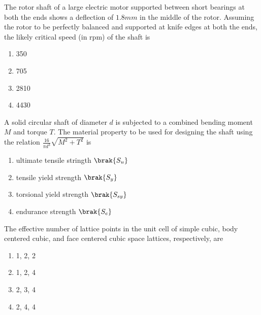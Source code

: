 \iffalse
\chapter{2009}
\author{AI24BTECH11031}
\section{me}
\fi

\item The rotor shaft of a large electric motor supported between short bearings at both the ends
shows a deflection of $1.8 mm$ in the middle of the rotor. Assuming the rotor to be perfectly balanced
and supported at knife edges at both the ends, the likely critical speed (in rpm) of the shaft is

\begin{multicols}{4}
\begin{enumerate}
    \item 350
    \item 705
    \item 2810
    \item 4430
\end{enumerate}
\end{multicols}

\item A solid circular shaft of diameter $d$ is subjected to a combined bending moment $M$ and torque
$T$. The material property to be used for designing the shaft using the relation $\frac{16}{\pi d^3}\sqrt{M^2 + T^2}$
is

\begin{multicols}{2}
\begin{enumerate}
    \item ultimate tensile stringth $\brak{S_u}$
    \item tensile yield strength $\brak{S_y}$
    \item torsional yield strength $\brak{S_{sy}}$
    \item endurance strength $\brak{S_e}$
\end{enumerate}
\end{multicols}

\item The effective number of lattice points in the unit cell of simple cubic, body centered cubic,
and face centered cubic space lattices, respectively, are
\begin{multicols}{4}
\begin{enumerate}
    \item 1, 2, 2
    \item 1, 2, 4
    \item 2, 3, 4
    \item 2, 4, 4
\end{enumerate}
\end{multicols}

